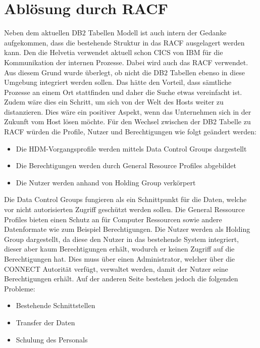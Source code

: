\section{Ablösung durch RACF}
\label{sec:chapter05:racF}
Neben dem aktuellen DB$2$ Tabellen Modell ist auch intern der Gedanke aufgekommen, dass die bestehende Struktur in das \ac{RACF} ausgelagert werden kann.
Den die Helvetia verwendet aktuell schon \ac{CICS} von IBM für die Kommunikation der internen Prozesse.
Dabei wird auch das \ac{RACF} verwendet.
Aus diesem Grund wurde überlegt, ob nicht die DB$2$ Tabellen ebenso in diese Umgebung integriert werden sollen.
Das hätte den Vorteil, dass sämtliche Prozesse an einem Ort stattfinden und daher die Suche etwas vereinfacht ist.
Zudem wäre dies ein Schritt, um sich von der Welt des Hosts weiter zu distanzieren.
Dies wäre ein positiver Aspekt, wenn das Unternehmen sich in der Zukunft vom Host lösen möchte.
\newline
\newline
Für den Wechsel zwischen der DB2 Tabelle zu \ac{RACF} würden die Profile, Nutzer und Berechtigungen wie folgt geändert werden:
\begin{itemize}
	\item Die HDM-Vorgangsprofile werden mittels Data Control Groups dargestellt
	\item Die Berechtigungen werden durch General Resource Profiles abgebildet
	\item Die Nutzer werden anhand von Holding Group verkörpert
\end{itemize}
Die Data Control Groups fungieren als ein Schnittpunkt für die Daten, welche vor nicht autorisierten Zugriff geschützt werden sollen. \cite{IBMdcg}
Die General Ressource Profiles bieten einen Schutz an für Computer Ressourcen sowie andere Datenformate wie zum Beispiel Berechtigungen. \cite{IBMgrp}
Die Nutzer werden als Holding Group dargestellt, da diese den Nutzer in das bestehende System integriert, dieser aber kaum Berechtigungen erhält, wodurch er keinen Zugriff auf die Berechtigungen hat.
Dies muss über einen Administrator, welcher über die CONNECT Autorität verfügt, verwaltet werden, damit der Nutzer seine Berechtigungen erhält. \cite{IBMhg}
\newline
\newline
Auf der anderen Seite bestehen jedoch die folgenden Probleme:
\begin{itemize}
	\item Bestehende Schnittstellen
	\item Transfer der Daten
	\item Schulung des Personals
\end{itemize}
